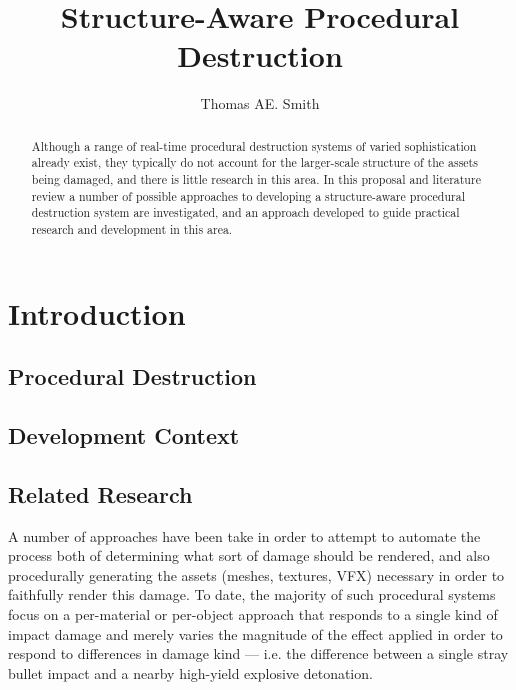 \documentclass[11pt]{report}
\title{Structure-Aware Procedural Destruction} \author{Thomas AE. Smith}
\begin{document}
\maketitle

\begin{abstract} %
	Although a range of real-time procedural destruction systems of varied sophistication already exist, they typically do not account for the larger-scale structure of the assets being damaged, and there is little research in this area.
	In this proposal and literature review a number of possible approaches to developing a structure-aware procedural destruction system are investigated, and an approach developed to guide practical research and development in this area.
\end{abstract}


\chapter{Introduction}
	\section{Procedural Destruction}
	\section{Development Context}
	\section{Related Research}
	A number of approaches have been take in order to attempt to automate the process both of determining what sort of damage should be rendered, and also procedurally generating the assets (meshes, textures, VFX) necessary in order to faithfully render this damage. To date, the majority of such procedural systems focus on a per-material or per-object approach that responds to a single kind of impact damage and merely varies the magnitude of the effect applied in order to respond to differences in damage kind --- i.e. the difference between a single stray bullet impact and a nearby high-yield explosive detonation.
\end{document}
